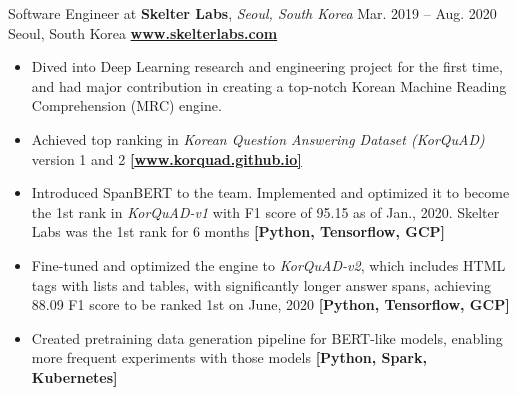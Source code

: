 \cveventflat
{Software Engineer at }
{\textbf{Skelter Labs}, \textit{Seoul, South Korea}}
{Mar. 2019 -- Aug. 2020}
{Seoul, South Korea}
\newline
\href{https://www.skelterlabs.com/}{\textbf{www.skelterlabs.com}}
\begin{itemize}
    \item Dived into Deep Learning research and engineering project for the first time, and had major contribution in creating a top-notch Korean Machine Reading Comprehension (MRC) engine.
    \item Achieved top ranking in \textit{Korean Question Answering Dataset (KorQuAD)} version 1 and 2
    \href{https://korquad.github.io/}{\textbf{[www.korquad.github.io]}}
    \item Introduced SpanBERT to the team. Implemented and optimized it to become the 1st rank in \textit{KorQuAD-v1} with F1 score of 95.15 as of Jan., 2020. Skelter Labs was the 1st rank for 6 months
    \textbf{[Python, Tensorflow, GCP]}
    \item Fine-tuned and optimized the engine to \textit{KorQuAD-v2}, which includes HTML tags with lists and tables, with significantly longer answer spans, achieving 88.09 F1 score to be ranked 1st on June, 2020
    \textbf{[Python, Tensorflow, GCP]}
    \item Created pretraining data generation pipeline for BERT-like models, enabling more frequent experiments with those models
    \textbf{[Python, Spark, Kubernetes]}
\end{itemize}
